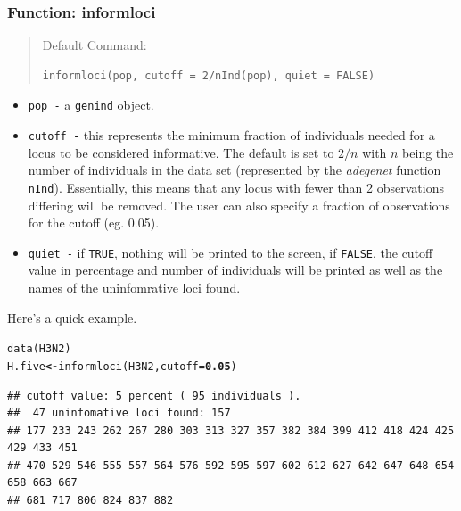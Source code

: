 \documentclass[letterpaper]{article}\usepackage[]{graphicx}\usepackage[]{color}
\makeatletter
\newcommand{\hlnum}[1]{\textcolor[rgb]{0.502,0,0.502}{\textbf{#1}}}%
\newcommand{\hlstd}[1]{\textcolor[rgb]{0,0,0}{#1}}%
\newcommand{\hlkwb}[1]{\textcolor[rgb]{0.502,0.502,0.753}{\textbf{#1}}}%
\newcommand{\hlkwc}[1]{\textcolor[rgb]{0,0.502,0.753}{#1}}%
\newcommand{\hlkwd}[1]{\textcolor[rgb]{0,0.267,0.4}{#1}}%
\newenvironment{kframe}{%
 \def\at@end@of@kframe{}%
 \ifinner\ifhmode%
  \def\at@end@of@kframe{\end{minipage}}%
  \begin{minipage}{\columnwidth}%
 \fi\fi%
 \def\FrameCommand##1{\hskip\@totalleftmargin \hskip-\fboxsep
 \colorbox{shadecolor}{##1}\hskip-\fboxsep
     \hskip-\linewidth \hskip-\@totalleftmargin \hskip\columnwidth}%
 \MakeFramed {\advance\hsize-\width
   \@totalleftmargin\z@ \linewidth\hsize
   \@setminipage}}%
 {\par\unskip\endMakeFramed%
 \at@end@of@kframe}
\newenvironment{knitrout}{}{} %
\makeatother
\begin{document}
\subsubsection{Function: informloci}\label{data.manip:informloci:informloci}
\begin{quote}
Default Command:
\begin{knitrout}
\color{fgcolor}\begin{kframe}
\begin{verbatim}
informloci(pop, cutoff = 2/nInd(pop), quiet = FALSE)
\end{verbatim}
\end{kframe}
\end{knitrout}

\end{quote}
  \begin{itemize}
    \item \texttt{pop -} a \texttt{genind} object.
    \item \texttt{cutoff -} this represents the minimum fraction of individuals needed for a locus to be considered informative. The default is set to $2/n$ with $n$ being the number of individuals in the data set (represented by the \textit{adegenet} function \texttt{nInd}). Essentially, this means that any locus with fewer than 2 observations differing will be removed. The user can also specify a fraction of observations for the cutoff (eg. 0.05).
    \item \texttt{quiet -} if \texttt{TRUE}, nothing will be printed to the screen, if \texttt{FALSE}, the cutoff value in percentage and number of individuals will be printed as well as the names of the uninfomrative loci found. 
  \end{itemize}

Here's a quick example.
\begin{knitrout}\footnotesize
{}\color{fgcolor}\begin{kframe}
\begin{alltt}
\hlkwd{data}\hlstd{(H3N2)}
\hlstd{H.five} \hlkwb{<-} \hlkwd{informloci}\hlstd{(H3N2,} \hlkwc{cutoff} \hlstd{=} \hlnum{0.05}\hlstd{)}
\end{alltt}
\end{kframe}
\end{knitrout}

\begin{knitrout}\footnotesize
{}\color{fgcolor}\begin{kframe}
\begin{verbatim}
## cutoff value: 5 percent ( 95 individuals ).
##  47 uninfomative loci found: 157 
## 177 233 243 262 267 280 303 313 327 357 382 384 399 412 418 424 425 429 433 451 
## 470 529 546 555 557 564 576 592 595 597 602 612 627 642 647 648 654 658 663 667 
## 681 717 806 824 837 882
\end{verbatim}
\end{kframe}
\end{knitrout}
\end{document}

